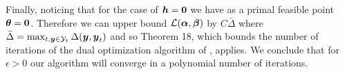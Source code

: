 \documentclass[10pt,journal,letterpaper,compsoc]{IEEEtran}
\renewcommand{\citename}{\citet}
\begin{document}
Finally, noticing that for the case of ${\boldsymbol{h}} = \textbf{0}$ we have as a
primal feasible point $\boldsymbol{\theta} = \textbf{0}$.  Therefore we can upper
bound $\Ell(\balpha, \bbeta)$ by $C \bar{\Delta}$ where $\bar{\Delta}
= \max_{t,\by \in \Y_t} \Delta(\by, \by_t)$ and so Theorem 18, which
bounds the number of iterations of the dual optimization algorithm of
\citename{Tsochantaridis:JMLR05}, applies. We conclude that for
$\epsilon > 0$ our algorithm will converge in a polynomial number of
iterations.
\end{document}
